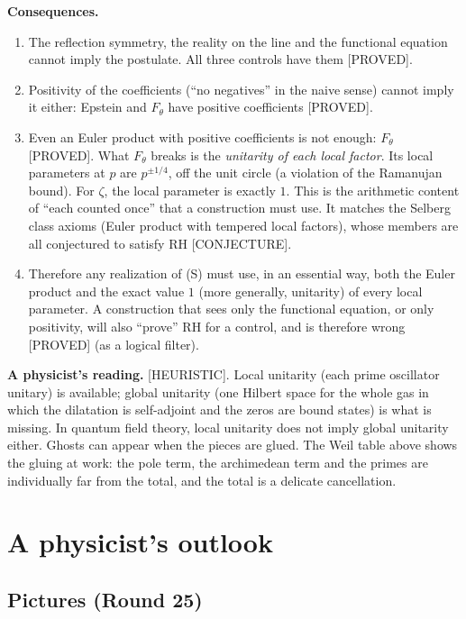 \documentclass[11pt,a4paper]{article}
\theoremstyle{plain}
\theoremstyle{definition}
\theoremstyle{remark}
\newcommand{\lab}[1]{\textsf{\small[#1]}}
\newcommand{\PROVED}{\lab{PROVED}}
\newcommand{\CONJ}{\lab{CONJECTURE}}
\newcommand{\HEUR}{\lab{HEURISTIC}}
\begin{document}
\noindent\textbf{Consequences.}
\begin{enumerate}[label=(\roman*)]
\item The reflection symmetry, the reality on the line and the functional
equation cannot imply the postulate. All three controls have them \PROVED.
\item Positivity of the coefficients (``no negatives'' in the naive sense)
cannot imply it either: Epstein and $F_\theta$ have positive coefficients
\PROVED.
\item Even an Euler product with positive coefficients is not enough:
$F_\theta$ \PROVED. What $F_\theta$ breaks is the \emph{unitarity of each
local factor}. Its local parameters at $p$ are $p^{\pm1/4}$, off the unit
circle (a violation of the Ramanujan bound). For $\zeta$, the local
parameter is exactly $1$. This is the arithmetic content of ``each counted
once'' that a construction must use. It matches the Selberg class axioms
(Euler product with tempered local factors), whose members are all
conjectured to satisfy RH \cite{Selberg1992} \CONJ.
\item Therefore any realization of (S) must use, in an essential way, both
the Euler product and the exact value $1$ (more generally, unitarity) of
every local parameter. A construction that sees only the functional
equation, or only positivity, will also ``prove'' RH for a control, and is
therefore wrong \PROVED{} (as a logical filter).
\end{enumerate}

\noindent\textbf{A physicist's reading.} \HEUR. Local unitarity (each prime
oscillator unitary) is available; global unitarity (one Hilbert space for
the whole gas in which the dilatation is self-adjoint and the zeros are
bound states) is what is missing. In quantum field theory, local
unitarity does not imply global unitarity either. Ghosts can appear when
the pieces are glued. The Weil table above shows the gluing at work: the
pole term, the archimedean term and the primes are individually far from
the total, and the total is a delicate cancellation.

\section{A physicist's outlook}
\label{sec:outlook}

\subsection{Pictures (Round 25)}
\end{document}
